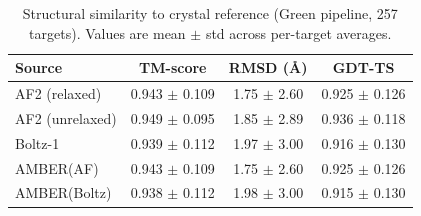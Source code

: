 \begin{table}[htbp]
\centering
\caption{Structural similarity to crystal reference (Green pipeline, 257 targets). Values are mean $\pm$ std across per-target averages.}
\label{tab:pre-rosetta-green}
\begin{tabular}{lccc}
\toprule
Source & TM-score & RMSD (\AA) & GDT-TS \\
\midrule
  AF2 (relaxed) & 0.943 $\pm$ 0.109 & 1.75 $\pm$ 2.60 & 0.925 $\pm$ 0.126 \\
  AF2 (unrelaxed) & 0.949 $\pm$ 0.095 & 1.85 $\pm$ 2.89 & 0.936 $\pm$ 0.118 \\
  Boltz-1 & 0.939 $\pm$ 0.112 & 1.97 $\pm$ 3.00 & 0.916 $\pm$ 0.130 \\
  AMBER(AF) & 0.943 $\pm$ 0.109 & 1.75 $\pm$ 2.60 & 0.925 $\pm$ 0.126 \\
  AMBER(Boltz) & 0.938 $\pm$ 0.112 & 1.98 $\pm$ 3.00 & 0.915 $\pm$ 0.130 \\
\bottomrule
\end{tabular}
\end{table}